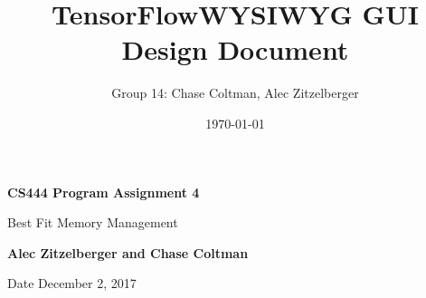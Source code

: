 \documentclass[journal,10pt,onecolumn,compsoc]{IEEEtran} \usepackage[margin=1.0in]{geometry} \usepackage{pdfpages}
\title{TensorFlow\texttrademark WYSIWYG GUI Design Document}
\author{Group 14: Chase Coltman, Alec Zitzelberger}
\date{\today}
\begin{document}
\begin{titlepage}
    \begin{center}
        \vspace*{1cm}
        
        \textbf{CS444 Program Assignment 4}
        
        \vspace{0.5cm}
        Best Fit Memory Management 
        
        \vspace{1.5cm}
        
        \textbf{Alec Zitzelberger and Chase Coltman}
        
        \vfill
        
       
        
        \vspace{0.8cm}
        
        
        
        Date December 2, 2017
        
    \end{center}
\end{titlepage}
\end{document}
